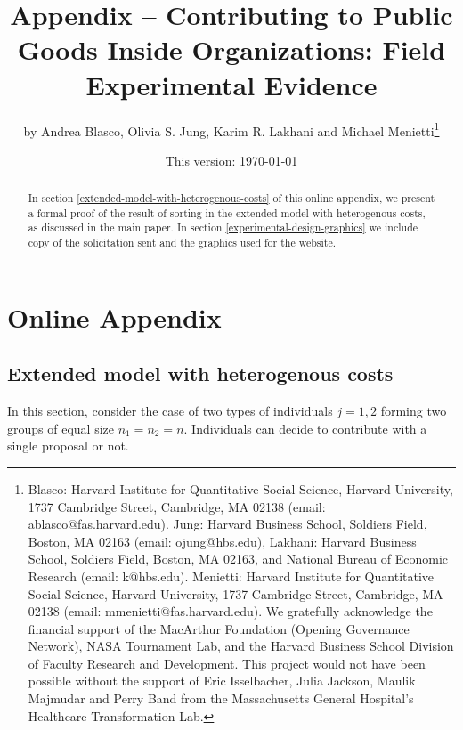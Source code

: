 \documentclass[11pt]{article} %
\title{%
Appendix -- Contributing to Public Goods Inside Organizations: Field Experimental Evidence
}
\author{%
by Andrea Blasco, Olivia S. Jung, Karim R. Lakhani and Michael Menietti\thanks{Blasco: Harvard Institute for Quantitative Social Science, Harvard University, 1737 Cambridge Street, Cambridge, MA 02138 (email: ablasco@fas.harvard.edu). Jung: Harvard Business School, Soldiers Field, Boston, MA 02163 (email: ojung@hbs.edu), Lakhani: Harvard Business School, Soldiers Field, Boston, MA 02163, and National Bureau of Economic Research (email: k@hbs.edu). Menietti: Harvard Institute for Quantitative Social Science, Harvard University, 1737 Cambridge Street, Cambridge, MA 02138 (email: mmenietti@fas.harvard.edu). We gratefully acknowledge the financial support of the MacArthur Foundation (Opening Governance Network), NASA Tournament Lab, and the Harvard Business School Division of Faculty Research and Development.  This project would not have been possible without the support of Eric Isselbacher, Julia Jackson, Maulik Majmudar and Perry Band from the Massachusetts General Hospital's Healthcare Transformation Lab.}
}
\date{%
This version: \today
}
\begin{document}
\maketitle

\begin{abstract}
In section \ref{extended-model-with-heterogenous-costs} of this online appendix, we present a formal proof of the result of sorting in the extended model with heterogenous costs, as discussed in the main paper. In section \ref{experimental-design-graphics} we include copy of the solicitation sent and the graphics used for the website. 
\end{abstract}



%
%
%
%
  
%

\appendix
\section{Online Appendix}

\subsection{Extended model with heterogenous costs}
\label{extended-model-with-heterogenous-costs}

In this section, consider the case of two types of individuals $j=1,2$ forming two groups of equal size $n_1=n_2=n$. Individuals can decide to contribute with a single proposal or not.  
\end{document}
